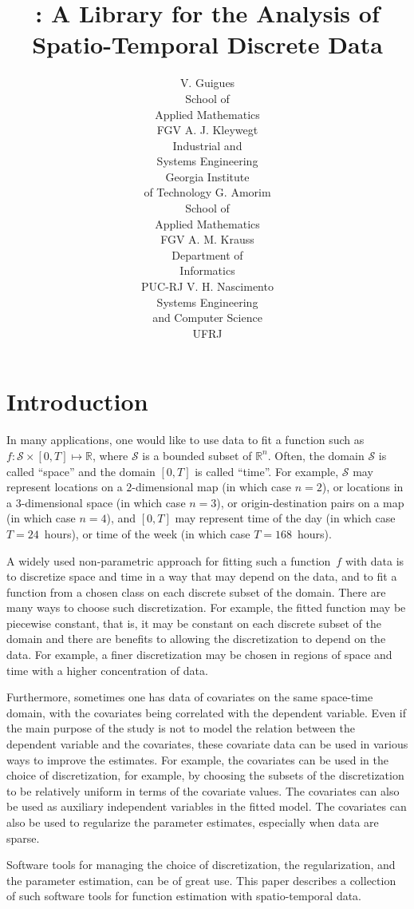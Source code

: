\documentclass[article]{jss}
\author{V. Guigues\\School of\\ Applied Mathematics\\ FGV \And 
A. J. Kleywegt\\Industrial and\\ Systems Engineering\\ Georgia Institute\\ of Technology \And
G. Amorim\\School of\\ Applied Mathematics\\ FGV \And
A. M. Krauss\\Department of\\ Informatics\\ PUC-RJ \And
V. H. Nascimento\\Systems Engineering\\ and Computer Science\\ UFRJ
}
\title{\pkg{LASPATED}: A Library for the Analysis of Spatio-Temporal Discrete Data}
\newcommand{\RR}{\mathbb{R}}
\begin{document}

\section{Introduction}

In many applications, one would like to use data to fit a function such as $f : \mathcal{S} \times [0,T] \mapsto \RR$, where $\mathcal{S}$ is a bounded subset of $\RR^{n}$.
Often, the domain $\mathcal{S}$ is called ``space'' and the domain $[0,T]$ is called ``time''.
For example, $\mathcal{S}$ may represent locations on a $2$-dimensional map (in which case $n = 2$), or locations in a $3$-dimensional space (in which case $n = 3$), or origin-destination pairs on a map (in which case $n = 4$), and $[0,T]$ may represent time of the day (in which case $T = 24$~hours), or time of the week (in which case $T = 168$~hours).

A widely used non-parametric approach for fitting such a function~$f$ with data is to discretize space and time in a way that may depend on the data, and to fit a function from a chosen class on each discrete subset of the domain.
There are many ways to choose such discretization. For example, the fitted function may be piecewise constant, that is, it may be constant on each discrete subset of the domain and there are benefits to allowing the discretization to depend on the data.
For example, a finer discretization may be chosen in regions of space and time with a higher concentration of data.

Furthermore, sometimes one has data of covariates on the same space-time domain, with the covariates being correlated with the dependent variable.
Even if the main purpose of the study is not to model the relation between the dependent variable and the covariates, these covariate data can be used in various ways to improve the estimates.
For example, the covariates can be used in the choice of discretization, for example, by choosing the subsets of the discretization to be relatively uniform in terms of the covariate values.
The covariates can also be used as auxiliary independent variables in the fitted model.
The covariates can also be used to regularize the parameter estimates, especially when data are sparse.

Software tools for managing the choice of discretization, the regularization, and the parameter estimation, can be of great use.
This paper describes a collection of such software tools for function estimation with spatio-temporal data.
\end{document}
